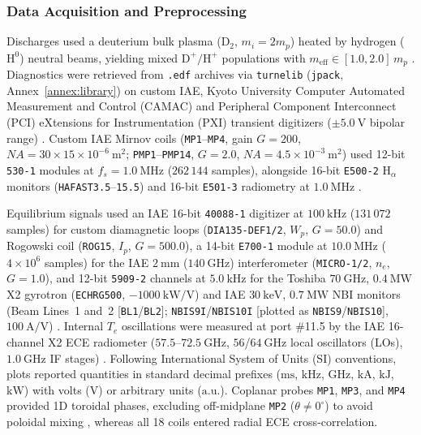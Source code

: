 \subsubsection{Data Acquisition and Preprocessing}
Discharges used a deuterium bulk plasma ($\mathrm{D}_2$, $m_i = 2m_p$) heated by hydrogen ($\mathrm{H}^0$) neutral beams, yielding mixed $\mathrm{D}^+/\mathrm{H}^+$ populations with $m_{\mathrm{eff}} \in [1.0, 2.0]\,m_p$ \cite{Yamamoto_2020, nagasaki2020heliotron}. Diagnostics were retrieved from \texttt{.edf} archives via \texttt{turnelib} (\texttt{jpack}, Annex~\ref{annex:library}) on custom IAE, Kyoto University Computer Automated Measurement and Control (CAMAC) and Peripheral Component Interconnect (PCI) eXtensions for Instrumentation (PXI) transient digitizers ($\pm 5.0~\mathrm{V}$ bipolar range) \cite{nagasaki2020heliotron, zang2019observation}. Custom IAE Mirnov coils (\texttt{MP1}--\texttt{MP4}, gain $G = 200$, $NA = 30 \times 15 \times 10^{-6}~\mathrm{m^2}$; \texttt{PMP1}--\texttt{PMP14}, $G = 2.0$, $NA = 4.5 \times 10^{-3}~\mathrm{m^2}$) used 12-bit \texttt{530-1} modules at $f_s = 1.0~\mathrm{MHz}$ ($262\,144$ samples), alongside 16-bit \texttt{E500-2} $\mathrm{H}_\alpha$ monitors (\texttt{HAFAST3.5}--\texttt{15.5}) and 16-bit \texttt{E501-3} radiometry at $1.0~\mathrm{MHz}$ \cite{nagasaki2020heliotron, zang2019observation}.

Equilibrium signals used an IAE 16-bit \texttt{40088-1} digitizer at $100~\mathrm{kHz}$ ($131\,072$ samples) for custom diamagnetic loops (\texttt{DIA135-DEF1/2}, $W_p$, $G = 50.0$) and Rogowski coil (\texttt{ROG15}, $I_p$, $G = 500.0$), a 14-bit \texttt{E700-1} module at $10.0~\mathrm{MHz}$ ($4 \times 10^6$ samples) for the IAE $2~\mathrm{mm}$ ($140~\mathrm{GHz}$) interferometer (\texttt{MICRO-1/2}, $n_e$, $G = 1.0$), and 12-bit \texttt{5909-2} channels at $5.0~\mathrm{kHz}$ for the Toshiba $70~\mathrm{GHz}$, $0.4~\mathrm{MW}$ X2 gyrotron (\texttt{ECHRG500}, $-1000~\mathrm{kW/V}$) and IAE $30~\mathrm{keV}$, $0.7~\mathrm{MW}$ NBI monitors (Beam Lines~1 and~2 [\texttt{BL1}/\texttt{BL2}]; \texttt{NBIS9I}/\texttt{NBIS10I} [plotted as \texttt{NBIS9}/\texttt{NBIS10}], $100~\mathrm{A/V}$) \cite{Yamamoto_2020, nagasaki2020heliotron}. Internal $T_e$ oscillations were measured at port \#11.5 by the IAE 16-channel X2 ECE radiometer ($57.5\text{--}72.5~\mathrm{GHz}$, $56$/$64~\mathrm{GHz}$ local oscillators (LOs), $1.0~\mathrm{GHz}$ IF stages) \cite{luo2020measurement, Weir2019}. Following International System of Units (SI) conventions, plots reported quantities in standard decimal prefixes ($\mathrm{ms}$, $\mathrm{kHz}$, $\mathrm{GHz}$, $\mathrm{kA}$, $\mathrm{kJ}$, $\mathrm{kW}$) with volts ($\mathrm{V}$) or arbitrary units ($\mathrm{a.u.}$). Coplanar probes \texttt{MP1}, \texttt{MP3}, and \texttt{MP4} provided 1D toroidal phases, excluding off-midplane \texttt{MP2} ($\theta \neq 0^\circ$) to avoid poloidal mixing \cite{Seo2019TheEO, schittenhelm1997analysis}, whereas all 18 coils entered radial ECE cross-correlation.

